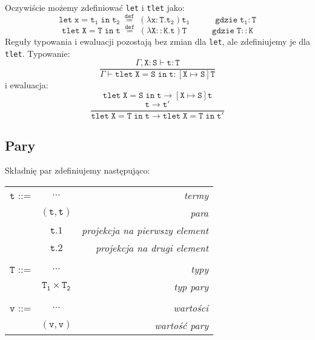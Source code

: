 \documentclass[11pt,leqno]{article}
\begin{document}
Oczywiście możemy zdefiniować \texttt{let} i \texttt{tlet} jako:
 	\[\mathtt{let\;x=t_1\;in\;t_2 \;\overset{def}{=}\;(\lambda x:T.t_2)t_1 \hspace{3em}\text{gdzie}\; t_1:T 
		}
	\]
 	\[\mathtt{tlet\;X=T\;in\;t \;\overset{def}{=}\;(\lambda X::K.t)T \hspace{3em}\text{gdzie}\; T::K 
		}
	\]
Reguły typowania i ewaluacji pozostają bez zmian dla \texttt{let}, ale zdefiniujemy je dla \texttt{tlet}.
Typowanie:
 	\[\mathtt{ \frac{\Gamma,X:S \vdash t:T}{\Gamma \vdash tlet\;X=S\;in\;t : [X \mapsto S]T}
		}
	\]
i ewaluacja:
 	\[\mathtt{ tlet\;X=S\;in\;t \longrightarrow [X \mapsto S]t
		}
	\]
 	\[\mathtt{ \frac{t \longrightarrow t'}{tlet\;X=T\;in\;t \longrightarrow tlet\;X=T\;in\;t'}
		}
	\]

\subsection{Pary}

Składnię par zdefiniujemy następująco:\\

\begin{tabular}{| l c r |}
  \hline
  $\mathtt{t}$ ::= & $\dots$ & \textit{termy}  \\
   & $\mathtt{(t,t)}$ & \textit{para} \\
   & $\mathtt{t.1}$ & \textit{projekcja na pierwszy element} \\ 
   & $\mathtt{t.2}$ & \textit{projekcja na drugi element} \\ 
   & & \\
  $\mathtt{T}$ ::= & $\dots$ & \textit{typy}  \\
   & $\mathtt{T_1\times T_2}$ & \textit{typ pary} \\
   & & \\
  $\mathtt{v}$ ::= & $\dots$ & \textit{wartości}  \\
   & $\mathtt{(v,v)}$ & \textit{wartość pary} \\
  \hline
\end{tabular} \\
\end{document}
